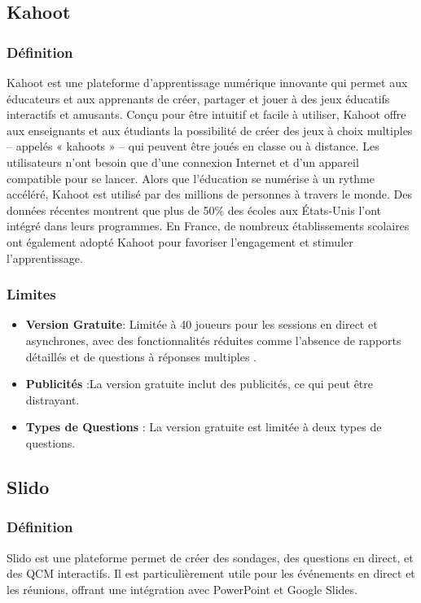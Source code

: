 \subsection{Kahoot}
\subsubsection{Définition}
Kahoot est une plateforme d’apprentissage numérique innovante qui permet aux éducateurs et aux apprenants de créer, partager et jouer à des jeux éducatifs interactifs et amusants. Conçu pour être intuitif et facile à utiliser, Kahoot offre aux enseignants et aux étudiants la possibilité de créer des jeux à choix multiples – appelés « kahoots » – qui peuvent être joués en classe ou à distance. Les utilisateurs n’ont besoin que d’une connexion Internet et d’un appareil compatible pour se lancer. Alors que l’éducation se numérise à un rythme accéléré, Kahoot est utilisé par des millions de personnes à travers le monde. Des données récentes montrent que plus de 50\% des écoles aux États-Unis l’ont intégré dans leurs programmes. En France, de nombreux établissements scolaires ont également adopté Kahoot pour favoriser l’engagement et stimuler l’apprentissage.
\subsubsection{Limites}
\begin{itemize}
   \item \textbf{Version Gratuite}: Limitée à 40 joueurs pour les sessions en direct et asynchrones, avec des fonctionnalités réduites comme l'absence de rapports détaillés et de questions à réponses multiples .
   \item \textbf{Publicités} :La version gratuite inclut des publicités, ce qui peut être distrayant.
   \item \textbf{Types de Questions} : La version gratuite est limitée à deux types de questions.
  \end{itemize}
\subsection{Slido}
\subsubsection{Définition}
Slido est une plateforme permet de créer des sondages, des questions en direct, et des QCM interactifs. Il est particulièrement utile pour les événements en direct et les réunions, offrant une intégration avec PowerPoint et Google Slides.
